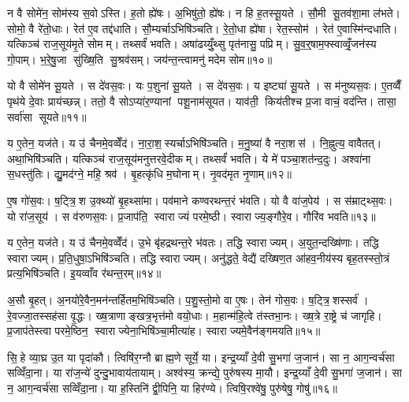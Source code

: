 न वै सोमे॑न॒ सोम॑स्य स॒वोऽस्ति। ह॒तो ह्ये॑षः। अ॒भिषु॑तो॒ ह्ये॑षः। न हि ह॒तस्सू॒यते। सौ॒मी सू॒तव॑शा॒मा ल॑भते। सोमो॒ वै रे॑तो॒धाः। रेत॑ ए॒व तद्द॑धाति। सौ॒म्यर्चाऽभिषि॑ञ्चति। रे॒तो॒धा ह्ये॑षा। रेत॒स्सोम॑। रेत॑ ए॒वास्मि॑न्दधाति। यत्किञ्च॑ राज॒सूय॑मृ॒ते सोमम्। तथ्सर्वं॑ भवति। अषा॑ढय्युँ॒थ्सु पृत॑नासु॒ पप्रिम्। सु॒व॒र्॒षाम॒फ्स्वाव्वृँ॒जन॑स्य गो॒पाम्। भ॒रे॒षु॒जा सु॑ख्षि॒ति सु॒श्रव॑सम्। जय॑न्त॒न्त्वामनु॑ मदेम सोम॥१०॥\anuvakamend[रेत॒स्सोम॑स्स॒प्त च॑]

यो वै सोमे॑न सू॒यते। स दे॑वस॒वः। यः प॒शुना॑ सू॒यते। स दे॑वस॒वः। य इष्ट्या॑ सू॒यते। स म॑नुष्यस॒वः। ए॒तव्वैँ पृथ॑ये दे॒वाः प्राय॑च्छन्न्। ततो॒ वै सोऽप्या॑र॒ण्यानां पशू॒नाम॑सूयत। याव॑ती॒ किय॑तीश्च प्र॒जा वाचं॒ वद॑न्ति। तासा॒ सर्वा॑सा सूयते॥११॥

य ए॒तेन॒ यज॑ते। य उ॑ चैनमे॒वव्वेँद॑। ना॒रा॒श॒स्यर्चाऽभिषि॑ञ्चति। म॒नु॒ष्या॑ वै नरा॒शस॑। नि॒ह्नुत्य॒ वावैतत्। अथा॒भिषि॑ञ्चति। यत्किञ्च॑ राज॒सूय॑मनुत्तरवे॒दीकम्। तथ्सर्वं॑ भवति। ये मे॑ पञ्चा॒शत॑न्द॒दुः। अश्वा॑ना स॒धस्तु॑तिः। द्यु॒मद॑ग्ने॒ महि॒ श्रव॑। बृ॒हत्कृ॑धि म॒घोनाम्। नृ॒वद॑मृत नृ॒णाम्॥१२॥\anuvakamend[सू॒य॒ते॒ स॒धस्तु॑ति॒स्त्रीणि॑ च]

ए॒ष गो॑स॒वः। ष॒ट्त्रि॒श उ॒क्थ्यो॑ बृ॒हथ्सा॑मा। पव॑माने कण्वरथन्त॒रं भ॑वति। यो वै वा॑ज॒पेय॑। स स॑म्राट्थ्स॒वः। यो रा॑ज॒सूय॑। स व॑रुणस॒वः। प्र॒जाप॑ति॒ स्वाराज्यं परमे॒ष्ठी। स्वाराज्य॒ङ्गौरे॒व। गौरि॑व भवति॥१३॥

य ए॒तेन॒ यज॑ते। य उ॑ चैनमे॒वव्वेँद॑। उ॒भे बृ॑हद्रथन्त॒रे भ॑वतः। तद्धि स्वाराज्यम्। अ॒युत॒न्दख्षि॑णाः। तद्धि स्वाराज्यम्। प्र॒ति॒धुषा॒ऽभिषि॑ञ्चति। तद्धि स्वाराज्यम्। अनु॑द्धते॒ वेद्यै॑ दख्षिण॒त आ॑हव॒नीय॑स्य बृह॒तस्स्तो॒त्रं प्रत्य॒भिषि॑ञ्चति। इ॒यव्वाँव र॑थन्त॒रम्॥१४॥

अ॒सौ बृ॒हत्। अ॒नयो॑रे॒वैन॒मन॑न्तर्\mbox{}हितम॒भिषि॑ञ्चति। प॒शु॒स्तो॒मो वा ए॒षः। तेन॑ गोस॒वः। ष॒ट्त्रि॒शस्सर्व॑। रे॒वज्जा॒तस्सह॑सा वृ॒द्धः। ख्ष॒त्राणाङ्खत्र॒भृत्त॑मो वयो॒धाः। म॒हान्म॑हि॒त्वे त॑स्तभा॒नः। ख्ष॒त्रे रा॒ष्ट्रे च॑ जागृहि। प्र॒जाप॑तेस्त्वा परमे॒ष्ठिन॒ स्वाराज्येना॒भिषि॑ञ्चा॒मीत्या॑ह। स्वाराज्यमे॒वैन॑ङ्गमयति॥१५॥\anuvakamend[इ॒व॒ भ॒व॒ति॒ र॒थ॒न्त॒रमा॒हैक॑ञ्च]

सि॒हे व्या॒घ्र उ॒त या पृदा॑कौ। त्विषि॑र॒ग्नौ ब्राह्म॒णे सूर्ये॒ या। इन्द्र॒य्याँ दे॒वी सु॒भगा॑ ज॒जान॑। सा न॒ आग॒न्वर्च॑सा सव्विँदा॒ना। या रा॑ज॒न्ये॑ दुन्दु॒भावाय॑तायाम्। अश्व॑स्य॒ क्रन्द्ये॒ पुरु॑षस्य मा॒यौ। इन्द्र॒य्याँ दे॒वी सु॒भगा॑ ज॒जान॑। सा न॒ आग॒न्वर्च॑सा सव्विँदा॒ना। या ह॒स्तिनि॑ द्वी॒पिनि॒ या हिर॑ण्ये। त्विषि॒रश्वे॑षु॒ पुरु॑षेषु॒ गोषु॑॥१६॥

